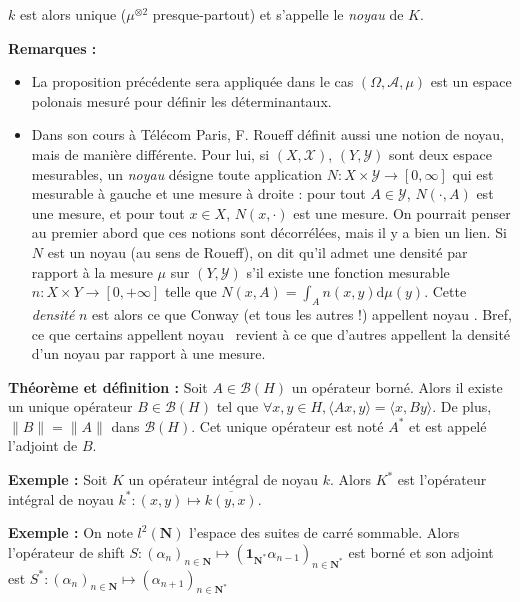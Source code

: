 \documentclass[12pt]{article}
\begin{document}
$k$ est alors unique ($ \mu^{\otimes 2} $ presque-partout) et s'appelle le \textit{noyau} de $K$. 

\textbf{Remarques :} 

\begin{itemize}

  \item La proposition précédente sera appliquée dans le cas $ (\Omega, \mathcal A, \mu) $ est un espace polonais mesuré pour définir les déterminantaux.

  \item Dans son cours à Télécom Paris, F. Roueff \cite{Roueff2024} définit aussi une notion de noyau, mais de manière différente. Pour lui, si $(X,\mathcal X)$, $(Y,\mathcal Y)$ sont deux espace mesurables, un \textit{noyau} désigne toute application $ N : X \times \mathcal Y \to [0,\infty] $ qui est mesurable à gauche et une mesure à droite : pour tout $A \in \mathcal Y$, $N (\cdot , A)$ est une mesure, et pour tout $x \in X$, $ N(x,\cdot) $ est une mesure. On pourrait penser au premier abord que ces notions sont décorrélées, mais il y a bien un lien. Si $N$ est un noyau (au sens de Roueff), on dit qu'il admet une densité par rapport à la mesure $\mu$ sur $(Y,\mathcal Y)$ s'il existe une fonction mesurable $n : X \times Y \to [0,+\infty] $ telle que $ \displaystyle N(x,A) = \int_A n(x,y) \mathrm d \mu(y) $. Cette \textit{densité} $n$ est alors ce que Conway (et tous les autres !) appellent \og noyau \fg. Bref, ce que certains appellent \og noyau \fg \, revient à ce que d'autres appellent la densité d'un noyau par rapport à une mesure.

\end{itemize}

\textbf{Théorème et définition :} Soit $A \in \mathcal B(H) $ un opérateur borné. Alors il existe un unique opérateur $ B \in  \mathcal B(H) $ tel que $ \forall x,y \in H, \langle Ax, y \rangle = \langle x, B y \rangle $. De plus, $ \| B \| = \| A \|$ dans $ \mathcal B(H) $. Cet unique opérateur est noté $ A^* $ et est appelé l'adjoint de $B$.

\textbf{Exemple :} Soit $K$ un opérateur intégral de noyau $k$. Alors $K^*$ est l'opérateur intégral de noyau $ k^* : (x,y) \mapsto \overline{k(y,x)} $.

\textbf{Exemple :} On note $ l^2(\mathbf N) $ l'espace des suites de carré sommable. Alors l'opérateur de shift $ S : (\alpha_n)_{n \in \mathbf N} \mapsto (\mathbf 1_{\mathbf N^*} \alpha_{n-1})_{n \in \mathbf N^*} $ est borné et son adjoint est $ S^* : (\alpha_n)_{n \in \mathbf N} \mapsto (\alpha_{n+1})_{n \in \mathbf N^*} $
\end{document}
